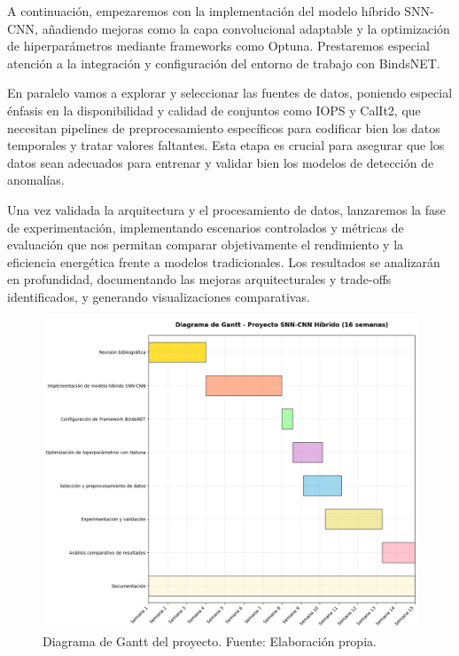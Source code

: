 A continuación, empezaremos con la implementación del modelo híbrido SNN-CNN, añadiendo mejoras como la capa convolucional adaptable y la optimización de hiperparámetros mediante frameworks como Optuna. Prestaremos especial atención a la integración y configuración del entorno de trabajo con BindsNET.

En paralelo vamos a explorar y seleccionar las fuentes de datos, poniendo especial énfasis en la disponibilidad y calidad de conjuntos como IOPS y CalIt2, que necesitan pipelines de preprocesamiento específicos para codificar bien los datos temporales y tratar valores faltantes. Esta etapa es crucial para asegurar que los datos sean adecuados para entrenar y validar bien los modelos de detección de anomalías.

Una vez validada la arquitectura y el procesamiento de datos, lanzaremos la fase de experimentación, implementando escenarios controlados y métricas de evaluación que nos permitan comparar objetivamente el rendimiento y la eficiencia energética frente a modelos tradicionales. Los resultados se analizarán en profundidad, documentando las mejoras arquitecturales y trade-offs identificados, y generando visualizaciones comparativas.

\begin{figure}[p] %
    \centering
    \includegraphics[width=\paperwidth,height=\paperheight,keepaspectratio,angle=90]{Imagenes/Gantt.png}
    \caption{Diagrama de Gantt del proyecto. Fuente: Elaboración propia.}
    \label{fig:Diagrama de Gantt}
\end{figure}